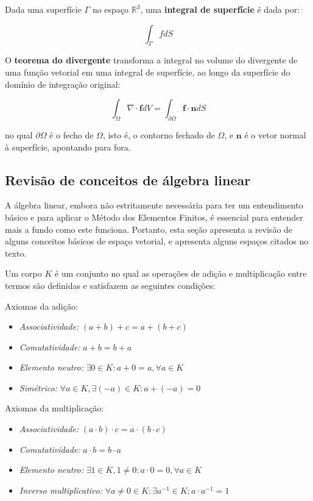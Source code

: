         Dada uma superfície $\Gamma$ no espaço $\mathbb{R}^3$, uma \textbf{integral de superfície} é dada por:

        \begin{equation*}
            \int_{\Gamma} f dS
        \end{equation*}

        O \textbf{teorema do divergente} transforma a integral no volume do divergente de uma função vetorial em uma integral de superfície, ao longo da superfície do domínio de integração original:

        \begin{equation*}
            \int_{\Omega} \nabla \cdot \mathbf{f} dV = \int_{\partial \Omega}  \mathbf{f} \cdot \mathbf{n} dS
        \end{equation*}

        \noindent no qual $\partial \Omega$ é o fecho de $\Omega$, isto é, o contorno fechado de $\Omega$, e $\mathbf{n}$ é o vetor normal à superfície, apontando para fora.

    \subsection{Revisão de conceitos de álgebra linear}
    \label{sec:algelin}

        A álgebra linear, embora não estritamente necessária para ter um entendimento básico e para aplicar o Método dos Elementos Finitos, é essencial para entender mais a fundo como este funciona. Portanto, esta seção apresenta a revisão de alguns conceitos básicos de espaço vetorial, e apresenta alguns espaços citados no texto.

        Um corpo $K$ é um conjunto no qual as operações de adição e multiplicação entre termos são definidas e satisfazem as seguintes condições:

        Axiomas da adição:
        \begin{itemize}
            \item \textit{Associatividade:} $(a+b)+c = a+(b+c)$
            \item \textit{Comutatividade:} $a+b=b+a$
            \item \textit{Elemento neutro:} $\exists 0 \in K : a+0=a, \forall a \in K$
            \item \textit{Simétrico:} $\forall a \in K, \exists (-a)\in K : a + (-a) = 0$
        \end{itemize}

        Axiomas da multiplicação:
        \begin{itemize}
            \item \textit{Associatividade:} $(a \cdot b) \cdot c = a \cdot (b \cdot c)$
            \item \textit{Comutatividade:} $a \cdot b=b \cdot a$
            \item \textit{Elemento neutro:} $\exists 1 \in K, 1\neq 0 : a \cdot 0 = 0, \forall a \in K$
            \item \textit{Inverso multiplicativo:} $\forall a \neq 0 \in K : \exists a^{-1}\in K : a \cdot a^{-1} = 1$
        \end{itemize}

